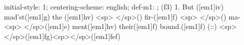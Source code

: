 initial-style: 1;
centering-scheme: english;
def-m1: \grealign;
(f3) 1. But ([em1]iv) mad'st([em1]g) the ([em1]hv) <sp> </sp>() fir-([em1]f) <sp> </sp>() ma-<sp> </sp>([em1]e) ment([em1]hv) their([em1]f) bound.([em1]f) (::) <sp></sp>([em1]fg)<sp></sp>([em1]fef)
